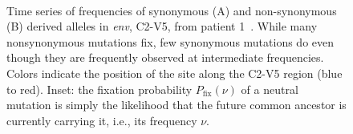 \documentclass[rmp, twocolumn]{revtex4}
\newcommand{\env}{\textit{env}}
\begin{document}
\begin{figure}
\begin{center}
\\
\caption{Time series of frequencies
of synonymous (A) and non-synonymous (B) derived alleles in \env, C2-V5, from patient
1~\cite{shankarappa_consistent_1999}.
While many nonsynonymous mutations  fix, few synonymous
mutations do even though they are frequently observed at intermediate
frequencies. Colors indicate the position of the site along the C2-V5 region
(blue to red). Inset: the fixation probability $P_\text{fix}(\nu)$ of a neutral mutation
is simply the likelihood that the future common ancestor is currently carrying
it, i.e., its frequency $\nu$.}
\label{fig:aft}
\end{center}
\end{figure}
\end{document}
